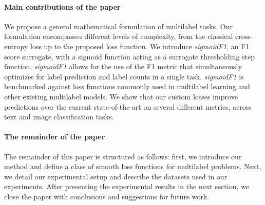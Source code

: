 \paragraph{Main contributions of the paper}
We propose a general mathematical formulation of multilabel tasks.
Our formulation encompasses different levels of complexity, from the classical cross-entropy loss up to the proposed loss function. We introduce \emph{sigmoidF1}, an F1 score surrogate, with a sigmoid function acting as a surrogate thresholding step function.
\emph{sigmoidF1} allows for the use of the F1 metric that simultaneously optimizes for label prediction and label counts in a single task.
\emph{sigmoidF1} is benchmarked against loss functions commonly used in multilabel learning and other existing multilabel models. We show that our custom losses improve predictions over the current state-of-the-art on several different metrics, across text and image classification tasks.

\paragraph{The remainder of the paper}
The remainder of this paper is structured as follows: first, we introduce our method and define a class of smooth loss functions for multilabel problems. Next, we detail our experimental setup and describe the datasets used in our experiments. After presenting the experimental results in the next section, we close the paper with conclusions and suggestions for future work.





